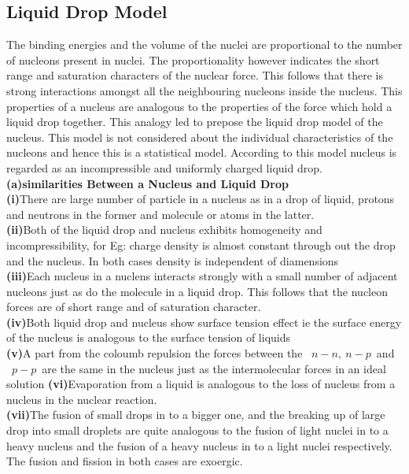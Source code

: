 \subsection{Liquid Drop Model}
The binding energies and the volume of the nuclei are proportional to the number of nucleons present in nuclei. The proportionality however indicates the short range and saturation characters of the nuclear force. This follows that there is strong interactions amongst all the neighbouring nucleons inside the nucleus. This properties of a nucleus are analogous to the properties of the force which hold a liquid drop together. This analogy led to prepose the liquid drop model of the nucleus. This model is not considered about the individual characteristics of the nucleons and hence this is a statistical model. According to this model nucleus is regarded as an incompressible and uniformly charged liquid drop.\\
\textbf{(a)\quad similarities Between a Nucleus and Liquid 
Drop}\\
\textbf{(i)}\quad There are large number of particle in a nucleus as in a drop of liquid, protons and neutrons in the former and molecule or atoms in the latter. \\
\textbf{(ii)}\quad Both of the liquid drop and nucleus exhibits homogeneity and incompressibility, for Eg: charge density is almost constant through out the drop and the nucleus. In both cases density is independent of diamensions \\
\textbf{(iii)}\quad Each nucleus in a nuclens interacts strongly with a small number of adjacent nucleons just as do the molecule in a liquid drop. This follows that the nucleon forces are of short range and of saturation character.\\
\textbf{(iv)}\quad Both liquid drop and nucleus show surface tension effect ie the surface energy of the nucleus is analogous to the surface tension of liquids \\
\textbf{(v)}\quad A part  from the coloumb repulsion the forces between the \ $n-n,\ n-p$\ and \ $p-p$\ are the same in the nucleus just as the intermolecular forces in an ideal solution
\textbf{(vi)}\quad Evaporation from a liquid is analogous to the loss of nucleus from a nucleus in the nuclear reaction.\\
\textbf{(vii)}\quad The fusion of small drops in to a bigger one, and the breaking up of large drop into small droplets are quite analogous to the fusion of light nuclei in to a heavy nucleus and the fusion of a heavy nucleus in to a light nuclei respectively. The fusion and fission in both cases are exoergic.\\
